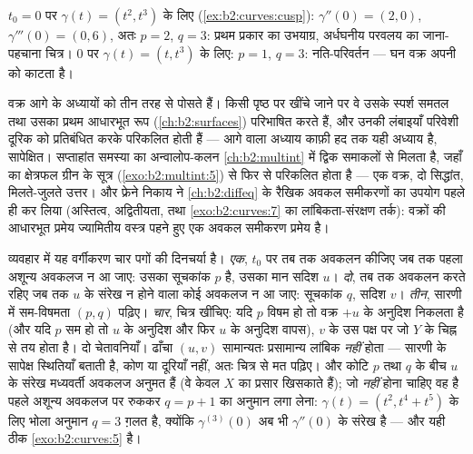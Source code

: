\begin{example}
$t_0 = 0$ पर $\gamma(t) = (t^2, t^3)$ के लिए
(\cref{ex:b2:curves:cusp}): $\gamma'' (0)= (2, 0)$, $\gamma'''(0) =
(0, 6)$, अतः $p = 2$, $q = 3$: प्रथम प्रकार का उभयाग्र,
अर्धघनीय परवलय का जाना-पहचाना चित्र। $0$ पर $\gamma(t) = (t,
t^3)$ के लिए: $p = 1$, $q = 3$: नति-परिवर्तन --- घन वक्र अपनी
 को काटता है।
\end{example}

\begin{remark}[इस खंड के भीतर के परिप्रेक्ष्य]
वक्र आगे के अध्यायों को तीन तरह से पोसते हैं। किसी पृष्ठ पर खींचे
जाने पर वे उसके स्पर्श समतल तथा उसका प्रथम आधारभूत रूप
(\cref{ch:b2:surfaces}) परिभाषित करते हैं, और उनकी लंबाइयाँ परिवेशी
दूरिक को प्रतिबंधित करके परिकलित होती हैं --- आगे वाला अध्याय काफ़ी
हद तक यही अध्याय है, सापेक्षित। सप्ताहांत समस्या का अन्वालोप-कलन
\cref{ch:b2:multint} में द्विक समाकलों से मिलता है, जहाँ  का
क्षेत्रफल ग्रीन के सूत्र (\cref{exo:b2:multint:5}) से फिर से परिकलित
होता है --- एक वक्र, दो सिद्धांत, मिलते-जुलते उत्तर। और फ्रेने निकाय
ने \cref{ch:b2:diffeq} के रैखिक अवकल समीकरणों का उपयोग पहले ही कर लिया
(अस्तित्व, अद्वितीयता, तथा \cref{exo:b2:curves:7} का लांबिकता-संरक्षण
तर्क): वक्रों की आधारभूत प्रमेय ज्यामितीय वस्त्र पहने हुए एक अवकल
समीकरण प्रमेय है।
\end{remark}

\begin{remark}[विधि: स्थानीय अध्ययन चलाना]
व्यवहार में यह वर्गीकरण चार पगों की दिनचर्या है।
\emph{एक}, $t_0$ पर तब तक अवकलन कीजिए जब तक पहला अशून्य
अवकलज न आ जाए: उसका सूचकांक $p$ है, उसका मान सदिश
$u$। \emph{दो}, तब तक अवकलन करते रहिए जब तक $u$ के संरेख
न होने वाला कोई अवकलज न आ जाए: सूचकांक $q$, सदिश $v$।
\emph{तीन}, सारणी में सम-विषमता $(p, q)$ पढ़िए।
\emph{चार}, चित्र खींचिए: यदि $p$ विषम हो तो वक्र $+u$ के
अनुदिश निकलता है (और यदि $p$ सम हो तो $u$ के अनुदिश और फिर
$u$ के अनुदिश वापस), $v$ के उस पक्ष पर जो $Y$ के चिह्न
से तय होता है। दो चेतावनियाँ। ढाँचा
$(u, v)$ सामान्यतः प्रसामान्य लांबिक \emph{नहीं} होता --- सारणी
 के सापेक्ष स्थितियाँ बताती है, कोण या दूरियाँ नहीं, अतः
चित्र से  मत पढ़िए। और कोटि $p$ तथा $q$ के बीच $u$
के संरेख मध्यवर्ती अवकलज अनुमत हैं (वे केवल $X$ का प्रसार
खिसकाते हैं); जो \emph{नहीं} होना चाहिए वह है पहले अशून्य अवकलज पर
रुककर $q = p + 1$ का अनुमान लगा लेना: $\gamma(t)
= (t^2, t^4 + t^5)$ के लिए भोला अनुमान $q = 3$ ग़लत है, क्योंकि
$\gamma^{(3)}(0)$ अब भी $\gamma''(0)$ के संरेख है ---
और यही ठीक \cref{exo:b2:curves:5} है।
\end{remark}

